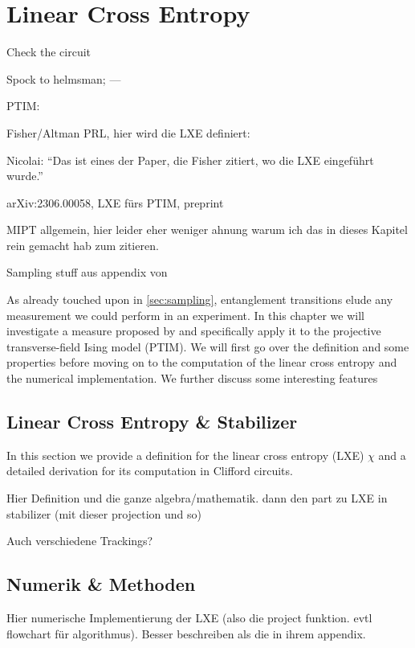 \chapter{Linear Cross Entropy}
\label{ch:lxe}
\epigraph{Check the circuit}{Spock to helmsman;
--- }

PTIM: \cite{langEntanglementTransitionProjective2020}

Fisher/Altman PRL, hier wird die LXE definiert: \cite{liCrossEntropyBenchmark2023}

Nicolai: \enquote{Das ist eines der Paper, die Fisher zitiert, wo die LXE eingeführt wurde.} \cite{baoSymmetryEnrichedPhases2021}

arXiv:2306.00058, LXE fürs PTIM, preprint \cite{tikhanovskayaUniversalityCrossEntropy2023}

MIPT allgemein, hier leider eher weniger ahnung warum ich das in dieses Kapitel rein
gemacht hab zum zitieren. \cite{baoTheoryPhaseTransition2020}

Sampling stuff aus appendix von \cite{roserDecodingProjectiveTransverse2023}

As already touched upon in \cref{sec:sampling}, entanglement transitions elude
any measurement we could perform in an experiment. In this chapter we will
investigate a measure proposed by \citeauthor{liCrossEntropyBenchmark2023} and
specifically apply it to the projective transverse-field Ising model (PTIM). We
will first go over the definition and some properties before moving on to the
computation of the linear cross entropy and the numerical implementation. We
further discuss some interesting features
\section{Linear Cross Entropy \& Stabilizer}
In this section we provide a definition for the linear cross entropy (LXE)
$\chi$ and a detailed derivation for its computation in Clifford circuits.

Hier Definition und die ganze algebra/mathematik. dann den part zu LXE in
stabilizer (mit dieser projection und so)

Auch verschiedene Trackings?

\section{Numerik \& Methoden}
\label{sec:lxe-numeric}
Hier numerische Implementierung der LXE (also die project funktion. evtl
flowchart für algorithmus). Besser beschreiben als die in ihrem appendix.

